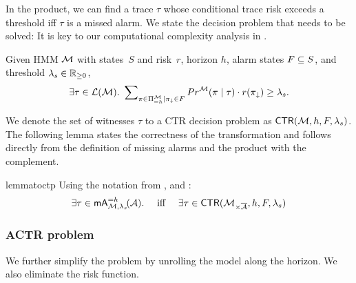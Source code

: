 \documentclass[runningheads]{llncs}
\newcommand{\missedalarms}[2]{\mathsf{mA}_{#1}^{#2}}
\begin{document}
In the product, we can find a trace $\tau$ whose conditional trace risk exceeds a threshold iff $\tau$ is a missed alarm.
We state the decision problem that needs to be solved: It is key to our computational complexity analysis in .
\begin{definition}
    \label{def:CTPdecprob}
    Given HMM $\mathcal{M}$ with states~$S$ and risk~$r$, horizon $h$, alarm states $F\subseteq S$, and threshold $\lambda_s \in \mathbb{R}_{\geq 0}$,  \[\exists \tau \in \mathcal{L}(\mathcal{M}).~ \sum\nolimits_{\pi\in\Pi^{\mathcal{M}}_{=h}\mid\pi_\downarrow \in F}{Pr}^{\mathcal{M}}(\pi \mid \tau) \cdot r(\pi_\downarrow) \geq \lambda_s.\]
\end{definition}
We denote the set of witnesses $\tau$ to a CTR decision problem as $\mathsf{CTR}(\mathcal{M}, h, F, \lambda_s)$.
The following lemma states the correctness of the transformation and follows directly from the definition of missing alarms and the product with the complement.
\begin{restatable}{lemma}{toctp}
    \label{lem:toctp}
    Using the notation from ,  and :
    \[ \exists \tau \in \missedalarms{\mc,\lambda_s}{= h}\!(\dfa). \quad\text{ iff }\quad \exists \tau \in \mathsf{CTR}(\mc_{\times\overline{\dfa}}, h, F, \lambda_s)\]
\end{restatable}

%

%


\subsubsection{ACTR problem}
We further simplify the problem by unrolling the model along the horizon. We also eliminate the risk function.
\end{document}
